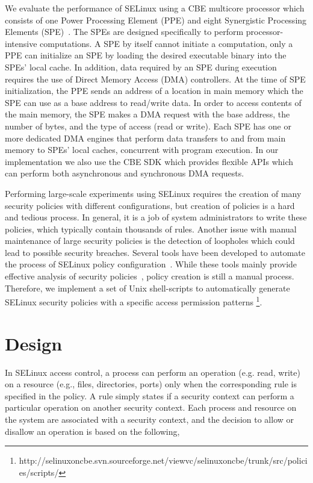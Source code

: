 \documentclass[conference]{IEEEtran}
\begin{document}
We evaluate the performance of SELinux using a CBE multicore processor
which consists of one Power Processing Element (PPE) and eight
Synergistic Processing Elements (SPE)~\cite{CBEArch}.  The SPEs are
designed specifically to perform processor-intensive computations.  A
SPE by itself cannot initiate a computation, only a PPE can initialize
an SPE by loading the desired executable binary into the SPEs' local
cache.  In addition, data required by an SPE during execution requires
the use of Direct Memory Access (DMA) controllers.  At the time of SPE
initialization, the PPE sends an address of a location in main memory
which the SPE can use as a base address to read/write data.  In order
to access contents of the main memory, the SPE makes a DMA request
with the base address, the number of bytes, and the type of access
(read or write).  Each SPE has one or more dedicated DMA engines that
perform data transfers to and from main memory to SPEs' local caches,
concurrent with program execution.  In our implementation we also use
the CBE SDK which provides flexible APIs which can perform both
asynchronous and synchronous DMA requests.

Performing large-scale experiments using SELinux requires the creation
of many security policies with different configurations, but creation
of policies is a hard and tedious process.  In general, it is a job of
system administrators to write these policies, which typically contain
thousands of rules.  Another issue with manual maintenance of large
security policies is the detection of loopholes which could lead to
possible security breaches.  Several tools have been developed to
automate the process of SELinux policy
configuration~\cite{selinuxTools}.  While these tools mainly provide
effective analysis of security policies~\cite{selinuxTools}, policy
creation is still a manual process.  Therefore, we implement a set of
Unix shell-scripts to automatically generate SELinux security policies
with a specific access permission patterns
\footnote{http://selinuxoncbe.svn.sourceforge.net/viewvc/selinuxoncbe/trunk/src/policies/scripts/}.

\section{Design}\label{design}

In SELinux access control, a process can perform an operation
(e.g. read, write) on a resource (e.g., files, directories, ports)
only when the corresponding rule is specified in the policy.  A rule
simply states if a security context can perform a particular operation
on another security context.  Each process and resource on the system
are associated with a security context, and the decision to allow or
disallow an operation is based on the following,
\end{document}
